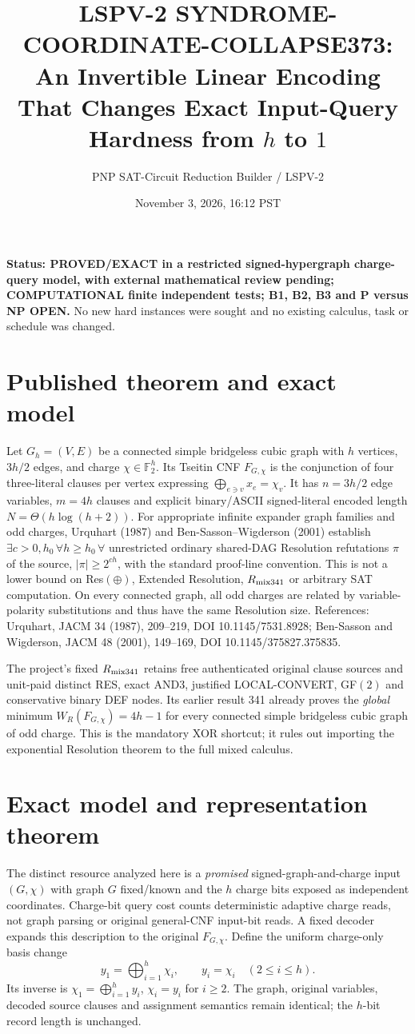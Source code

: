 \documentclass[11pt]{article}
\title{LSPV-2 SYNDROME-COORDINATE-COLLAPSE373: An Invertible Linear Encoding That Changes Exact Input-Query Hardness from $h$ to $1$}
\author{PNP SAT-Circuit Reduction Builder / LSPV-2}
\date{November 3, 2026, 16:12 PST}
\begin{document}
\maketitle
\noindent\textbf{Status: PROVED/EXACT in a restricted signed-hypergraph charge-query model, with external mathematical review pending; COMPUTATIONAL finite independent tests; B1, B2, B3 and P versus NP OPEN.} No new hard instances were sought and no existing calculus, task or schedule was changed.

\section*{Published theorem and exact model}
Let $G_h=(V,E)$ be a connected simple bridgeless cubic graph with $h$ vertices, $3h/2$ edges, and charge $\chi\in\mathbb F_2^h$. Its Tseitin CNF $F_{G,\chi}$ is the conjunction of four three-literal clauses per vertex expressing $\bigoplus_{e\ni v}x_e=\chi_v$. It has $n=3h/2$ edge variables, $m=4h$ clauses and explicit binary/ASCII signed-literal encoded length $N=\Theta(h\log(h+2))$. For appropriate infinite expander graph families and odd charges, Urquhart (1987) and Ben-Sasson--Wigderson (2001) establish $\exists c>0,h_0\,\forall h\ge h_0\,\forall$ unrestricted ordinary shared-DAG Resolution refutations $\pi$ of the source, $|\pi|\ge2^{ch}$, with the standard proof-line convention. This is not a lower bound on Res$(\oplus)$, Extended Resolution, $R_{\rm mix341}$ or arbitrary SAT computation. On every connected graph, all odd charges are related by variable-polarity substitutions and thus have the same Resolution size. References: Urquhart, JACM 34 (1987), 209--219, DOI 10.1145/7531.8928; Ben-Sasson and Wigderson, JACM 48 (2001), 149--169, DOI 10.1145/375827.375835.

The project's fixed $R_{\rm mix341}$ retains free authenticated original clause sources and unit-paid distinct RES, exact AND3, justified LOCAL-CONVERT, GF$(2)$ and conservative binary DEF nodes. Its earlier result 341 already proves the \emph{global} minimum $W_R(F_{G,\chi})=4h-1$ for every connected simple bridgeless cubic graph of odd charge. This is the mandatory XOR shortcut; it rules out importing the exponential Resolution theorem to the full mixed calculus.

\section*{Exact model and representation theorem}
The distinct resource analyzed here is a \emph{promised} signed-graph-and-charge input $(G,\chi)$ with graph $G$ fixed/known and the $h$ charge bits exposed as independent coordinates. Charge-bit query cost counts deterministic adaptive charge reads, not graph parsing or original general-CNF input-bit reads. A fixed decoder expands this description to the original $F_{G,\chi}$. Define the uniform charge-only basis change
\[
y_1=\bigoplus_{i=1}^h\chi_i,\qquad y_i=\chi_i\quad(2\le i\le h).
\]
Its inverse is $\chi_1=\bigoplus_{i=1}^h y_i$, $\chi_i=y_i$ for $i\ge2$. The graph, original variables, decoded source clauses and assignment semantics remain identical; the $h$-bit record length is unchanged.
\end{document}
